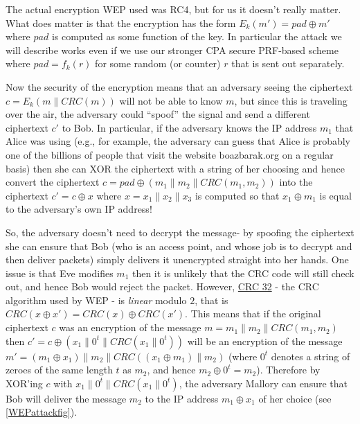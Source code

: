 The actual encryption WEP used was RC4, but for us it doesn't really
matter. What does matter is that the encryption has the form
\(E_k(m') = pad \oplus m'\) where \(pad\) is computed as some function
of the key. In particular the attack we will describe works even if we
use our stronger CPA secure PRF-based scheme where \(pad=f_k(r)\) for
some random (or counter) \(r\) that is sent out separately.

Now the security of the encryption means that an adversary seeing the
ciphertext \(c=E_k(m\|\ensuremath{\mathit{CRC}}(m))\) will not be able
to know \(m\), but since this is traveling over the air, the adversary
could ``spoof'' the signal and send a different ciphertext \(c'\) to
Bob. In particular, if the adversary knows the IP address \(m_1\) that
Alice was using (e.g., for example, the adversary can guess that Alice
is probably one of the billions of people that visit the website
boazbarak.org on a regular basis) then she can XOR the ciphertext with a
string of her choosing and hence convert the ciphertext
\(c = pad \oplus (m_1\| m_2 \|\ensuremath{\mathit{CRC}}(m_1,m_2))\) into
the ciphertext \(c' = c \oplus x\) where \(x = x_1\|x_2\|x_3\) is
computed so that \(x_1 \oplus m_1\) is equal to the adversary's own IP
address!

So, the adversary doesn't need to decrypt the message- by spoofing the
ciphertext she can ensure that Bob (who is an access point, and whose
job is to decrypt and then deliver packets) simply delivers it
unencrypted straight into her hands. One issue is that Eve modifies
\(m_1\) then it is unlikely that the CRC code will still check out, and
hence Bob would reject the packet. However,
\href{https://goo.gl/5aqEHB}{CRC 32} - the CRC algorithm used by WEP -
is \emph{linear} modulo \(2\), that is
\(\ensuremath{\mathit{CRC}}(x \oplus x') = \ensuremath{\mathit{CRC}}(x)\oplus \ensuremath{\mathit{CRC}}(x')\).
This means that if the original ciphertext \(c\) was an encryption of
the message \(m= m_1 \| m_2 \| \ensuremath{\mathit{CRC}}(m_1,m_2)\) then
\(c'=c \oplus (x_1\|0^t\|\ensuremath{\mathit{CRC}}(x_1\|0^t))\) will be
an encryption of the message
\(m'=(m_1 \oplus x_1) \|m_2 \| \ensuremath{\mathit{CRC}}( (x_1\oplus m_1) \| m_2)\)
(where \(0^t\) denotes a string of zeroes of the same length \(t\) as
\(m_2\), and hence \(m_2 \oplus 0^t = m_2\)). Therefore by XOR'ing \(c\)
with \(x_1 \|0^t \| \ensuremath{\mathit{CRC}}(x_1\|0^t)\), the adversary
Mallory can ensure that Bob will deliver the message \(m_2\) to the IP
address \(m_1 \oplus x_1\) of her choice (see \cref{WEPattackfig}).

